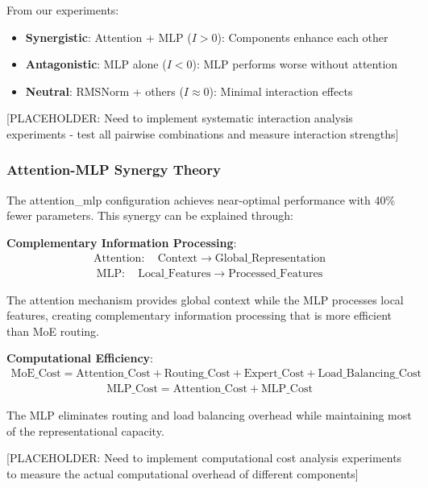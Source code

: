 \documentclass[11pt,a4paper]{article}
\begin{document}
From our experiments:
\begin{itemize}
    \item \textbf{Synergistic}: Attention + MLP ($I > 0$): Components enhance each other
    \item \textbf{Antagonistic}: MLP alone ($I < 0$): MLP performs worse without attention
    \item \textbf{Neutral}: RMSNorm + others ($I \approx 0$): Minimal interaction effects
\end{itemize}

[PLACEHOLDER: Need to implement systematic interaction analysis experiments - test all pairwise combinations and measure interaction strengths]

\subsubsection{Attention-MLP Synergy Theory}

The attention\_mlp configuration achieves near-optimal performance with 40\% fewer parameters. This synergy can be explained through:

\textbf{Complementary Information Processing}:
\begin{align}
\text{Attention}: \quad \text{Context} \rightarrow \text{Global\_Representation}
\end{align}
\begin{align}
\text{MLP}: \quad \text{Local\_Features} \rightarrow \text{Processed\_Features}
\end{align}

The attention mechanism provides global context while the MLP processes local features, creating complementary information processing that is more efficient than MoE routing.

\textbf{Computational Efficiency}:
\begin{align}
\text{MoE\_Cost} = \text{Attention\_Cost} + \text{Routing\_Cost} + \text{Expert\_Cost} + \text{Load\_Balancing\_Cost}
\end{align}
\begin{align}
\text{MLP\_Cost} = \text{Attention\_Cost} + \text{MLP\_Cost}
\end{align}

The MLP eliminates routing and load balancing overhead while maintaining most of the representational capacity.

[PLACEHOLDER: Need to implement computational cost analysis experiments to measure the actual computational overhead of different components]
\end{document}
